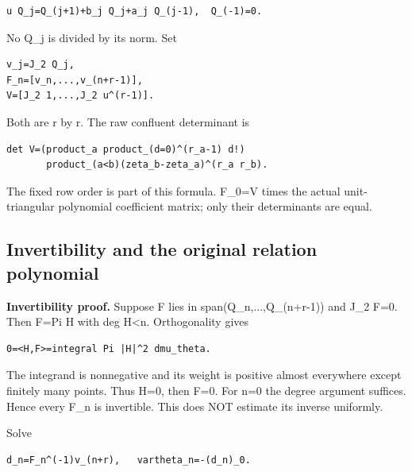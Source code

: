 \begin{Verbatim}[breaklines=true,breakanywhere=true,fontsize=\small]
u Q_j=Q_(j+1)+b_j Q_j+a_j Q_(j-1),  Q_(-1)=0.
\end{Verbatim}

No Q\_j is divided by its norm. Set

\begin{Verbatim}[breaklines=true,breakanywhere=true,fontsize=\small]
v_j=J_2 Q_j,
F_n=[v_n,...,v_(n+r-1)],
V=[J_2 1,...,J_2 u^(r-1)].
\end{Verbatim}

Both are r by r. The raw confluent determinant is

\begin{Verbatim}[breaklines=true,breakanywhere=true,fontsize=\small]
det V=(product_a product_(d=0)^(r_a-1) d!)
       product_(a<b)(zeta_b-zeta_a)^(r_a r_b).
\end{Verbatim}

The fixed row order is part of this formula. F\_0=V times the actual
unit-triangular polynomial coefficient matrix; only their determinants
are equal.

\subsection[\hspace{0.4em}Invertibility and the original relation
polynomial]{Invertibility and the original relation
polynomial}\label{confluent-transfer-invertibility-and-the-original-relation-polynomial}

\textbf{Invertibility proof.} Suppose F lies in
span(Q\_n,...,Q\_(n+r-1)) and J\_2 F=0. Then F=Pi H with deg
H\textless n. Orthogonality gives

\begin{Verbatim}[breaklines=true,breakanywhere=true,fontsize=\small]
0=<H,F>=integral Pi |H|^2 dmu_theta.
\end{Verbatim}

The integrand is nonnegative and its weight is positive almost
everywhere except finitely many points. Thus H=0, then F=0. For n=0 the
degree argument suffices. Hence every F\_n is invertible. This does NOT
estimate its inverse uniformly.

Solve

\begin{Verbatim}[breaklines=true,breakanywhere=true,fontsize=\small]
d_n=F_n^(-1)v_(n+r),   vartheta_n=-(d_n)_0.
\end{Verbatim}

